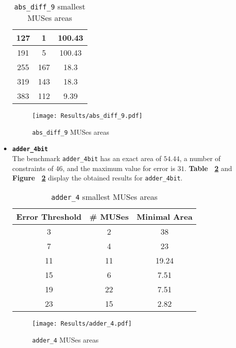 \documentclass[]{usiinfbachelorproject}
\begin{document}
\begin{itemize}
\begin{table}[H]
\begin{tabular}{c|c|c}
                \hline
                127 & 1 & 100.43 \\
                \hline
                191 & 5 & 100.43 \\
                \hline
                255 & 167 & 18.3 \\
                \hline
                319 & 143 & 18.3 \\
                \hline
                383 & 112 & 9.39    
            \end{tabular}
            \caption{\texttt{abs\_diff\_9} smallest MUSes areas}
            \label{tab:r2}
        \end{table}
        \begin{figure}[H]
            \centering
            \texttt{[image: Results/abs\_diff\_9.pdf]}
            \caption{\texttt{abs\_diff\_9} MUSes areas}
            \label{fig:r2}
        \end{figure}
    \item \texttt{\textbf{adder\_4bit}}\\
        The benchmark \texttt{adder\_4bit} has an exact area of $54.44$, a number of constraints of $46$, and the maximum value for error is $31$. \textbf{Table ~\ref{tab:r3}} and \textbf{Figure ~\ref{fig:r3}} display the obtained results for \texttt{adder\_4bit}.
        \begin{table}[H]
            \centering
            \begin{tabular}{c|c|c}
                \textbf{Error Threshold} & \textbf{\# MUSes} & \textbf{Minimal Area} \\ \hline
                3 & 2 & 38 \\
                \hline
                7 & 4 & 23 \\
                \hline
                11 & 11 & 19.24 \\
                \hline
                15 & 6 & 7.51 \\
                \hline
                19 & 22 & 7.51 \\
                \hline
                23 & 15 & 2.82    
            \end{tabular}
            \caption{\texttt{adder\_4} smallest MUSes areas}
            \label{tab:r3}
        \end{table}
        \begin{figure}[H]
            \centering
            \texttt{[image: Results/adder\_4.pdf]}
            \caption{\texttt{adder\_4} MUSes areas}
            \label{fig:r3}

\end{figure}
\end{itemize}
\end{document}
